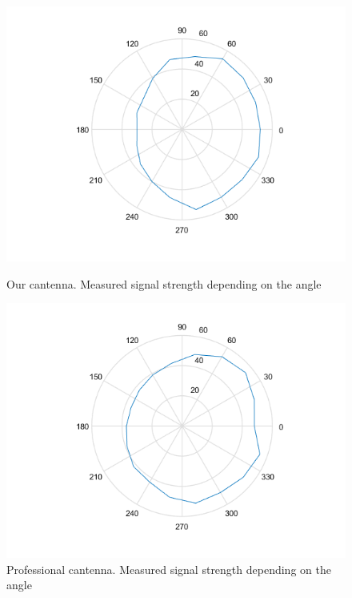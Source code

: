 \documentclass[12pt,a4paper]{article}
\newcommand{\figurewidth}[0]{.65\textwidth}
\begin{document}
\begin{figure}\begin{center}
	\includegraphics[width=\figurewidth]{plots/polar_can_p.png}
	\caption{Our cantenna. Measured signal strength depending on the angle}
	\label{img:ang:pow:can}

	\includegraphics[width=\figurewidth]{plots/polar_prof_p.png}
	\caption{Professional cantenna. Measured signal strength depending on the angle}
	\label{img:ang:pow:prof}


\end{center}
\end{figure}
\end{document}

